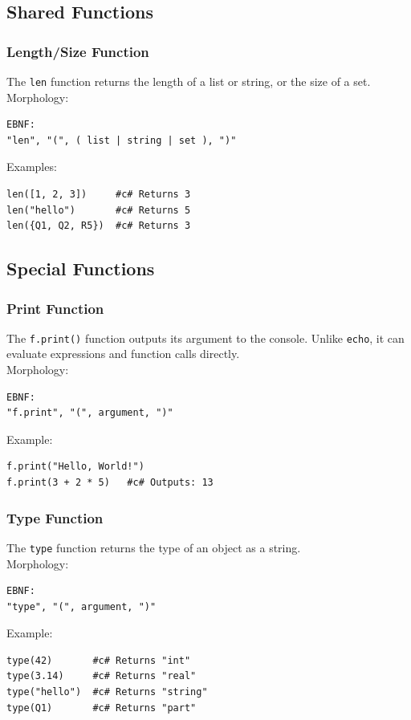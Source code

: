 \documentclass{report}
\begin{document}
\subsection{Shared Functions}

\subsubsection{Length/Size Function}
The \texttt{len} function returns the length of a list or string, or the size of a set. \\
Morphology:
\begin{verbatim}
EBNF:
"len", "(", ( list | string | set ), ")"
\end{verbatim}
Examples:
\begin{verbatim}
len([1, 2, 3])     #c# Returns 3
len("hello")       #c# Returns 5
len({Q1, Q2, R5})  #c# Returns 3
\end{verbatim}


\subsection{Special Functions}

\subsubsection{Print Function}
The \texttt{f.print()} function outputs its argument to the console. Unlike \texttt{echo}, it can evaluate expressions and function calls directly. \\
Morphology:
\begin{verbatim}
EBNF:
"f.print", "(", argument, ")"
\end{verbatim}
Example:
\begin{verbatim}
f.print("Hello, World!")
f.print(3 + 2 * 5)   #c# Outputs: 13
\end{verbatim}

\subsubsection{Type Function}
The \texttt{type} function returns the type of an object as a string. \\
Morphology:
\begin{verbatim}
EBNF:
"type", "(", argument, ")"
\end{verbatim}
Example:
\begin{verbatim}
type(42)       #c# Returns "int"
type(3.14)     #c# Returns "real"
type("hello")  #c# Returns "string"
type(Q1)       #c# Returns "part"
\end{verbatim}
\end{document}
